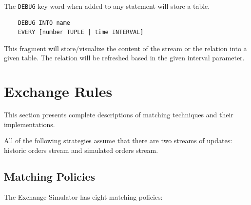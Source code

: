 \documentclass{article}
\begin{document}
The {\tt DEBUG} key word when added to any statement will store a table.

\begin{verbatim}
    DEBUG INTO name
    EVERY [number TUPLE | time INTERVAL] 
\end{verbatim} 

This fragment will store/visualize the content of the stream or the relation into a given table. The relation will be refreshed based in the given interval parameter.

\section{Exchange Rules}

This section presents complete descriptions of matching techniques and their implementations. 

All of the following strategies assume that there are two streams of updates: historic orders stream and simulated orders stream.

\subsection{Matching Policies}

The Exchange Simulator has eight matching policies:
\end{document}
